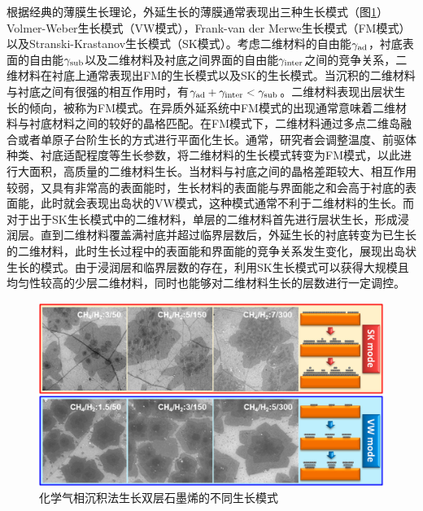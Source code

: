     根据经典的薄膜生长理论，外延生长的薄膜通常表现出三种生长模式（图\ref{fig:intro_growth_grapheneGrowthMode}）\chinesecolon Volmer-Weber生长模式（VW模式），Frank-van der Merwe生长模式（FM模式）以及Stranski-Krastanov生长模式（SK模式）。考虑二维材料的自由能$\gamma_{\rm ad}$，衬底表面的自由能$\gamma_{\rm sub}$以及二维材料及衬底之间界面的自由能$\gamma_{\rm inter}$之间的竞争关系，二维材料在衬底上通常表现出FM的生长模式以及SK的生长模式。当沉积的二维材料与衬底之间有很强的相互作用时，有$\gamma_{\rm ad}+\gamma_{\rm inter}<\gamma_{\rm sub}$。二维材料表现出层状生长的倾向，被称为FM模式。在异质外延系统中FM模式的出现通常意味着二维材料与衬底材料之间的较好的晶格匹配。在FM模式下，二维材料通过多点二维岛融合或者单原子台阶生长的方式进行平面化生长。通常，研究者会调整温度、前驱体种类、衬底适配程度等生长参数，将二维材料的生长模式转变为FM模式，以此进行大面积，高质量的二维材料生长。当材料与衬底之间的晶格差距较大、相互作用较弱，又具有非常高的表面能时，生长材料的表面能与界面能之和会高于衬底的表面能，此时就会表现出岛状的VW模式，这种模式通常不利于二维材料的生长。而对于出于SK生长模式中的二维材料，单层的二维材料首先进行层状生长，形成浸润层。直到二维材料覆盖满衬底并超过临界层数后，外延生长的衬底转变为已生长的二维材料，此时生长过程中的表面能和界面能的竞争关系发生变化，展现出岛状生长的模式。由于浸润层和临界层数的存在，利用SK生长模式可以获得大规模且均匀性较高的少层二维材料，同时也能够对二维材料生长的层数进行一定调控。

    \begin{figure}[htb]
        \includegraphics{pic/INTRO_growth_grapheneGrowthMode.png}
        \caption{化学气相沉积法生长双层石墨烯的不同生长模式}
        \label{fig:intro_growth_grapheneGrowthMode}
    \end{figure}

